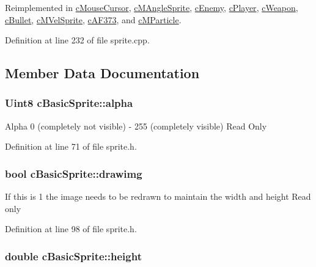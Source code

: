 Reimplemented in \hyperlink{classc_mouse_cursor_aa63dd0498aacf4cb6212dff7f3c0cfcb}{c\-Mouse\-Cursor}, \hyperlink{classc_m_angle_sprite_a42facb500fb312966e8babe1e9f00956}{c\-M\-Angle\-Sprite}, \hyperlink{classc_enemy_af63fe08e8a91d670c29c81b4dae76cc7}{c\-Enemy}, \hyperlink{classc_player_a28a14211f3f36ed0ef550fc973ab1858}{c\-Player}, \hyperlink{classc_weapon_a9b2117eb3f699f86617ffc47dc72e9e4}{c\-Weapon}, \hyperlink{classc_bullet_a19e5203aca92a91dbb4ebf64a15c28f1}{c\-Bullet}, \hyperlink{classc_m_vel_sprite_a0472c4eecda7bba06bef8bb5a8a2312f}{c\-M\-Vel\-Sprite}, \hyperlink{classc_a_f373_acbc4a7495a52eeeac9f25fd09b390173}{c\-A\-F373}, and \hyperlink{classc_m_particle_a51a5aef9295c60549d64fdf87aa06524}{c\-M\-Particle}.



Definition at line 232 of file sprite.\-cpp.



\subsection{Member Data Documentation}
\hypertarget{classc_basic_sprite_ad0eff9f7fd9db3496da83a65d625983c}{
\subsubsection[{alpha}]{\setlength{\rightskip}{0pt plus 5cm}Uint8 c\-Basic\-Sprite\-::alpha}}\label{classc_basic_sprite_ad0eff9f7fd9db3496da83a65d625983c}
Alpha 0 (completely not visible) -\/ 255 (completely visible) Read Only 

Definition at line 71 of file sprite.\-h.

\hypertarget{classc_basic_sprite_a80fbb5b9f21f36769c2a7992994a0042}{
\subsubsection[{drawimg}]{\setlength{\rightskip}{0pt plus 5cm}bool c\-Basic\-Sprite\-::drawimg}}\label{classc_basic_sprite_a80fbb5b9f21f36769c2a7992994a0042}
If this is 1 the image needs to be redrawn to maintain the width and height Read only 

Definition at line 98 of file sprite.\-h.

\hypertarget{classc_basic_sprite_a088106d3526c96d42f8a951f7ccf8b80}{
\subsubsection[{height}]{\setlength{\rightskip}{0pt plus 5cm}double c\-Basic\-Sprite\-::height}}\label{classc_basic_sprite_a088106d3526c96d42f8a951f7ccf8b80}


